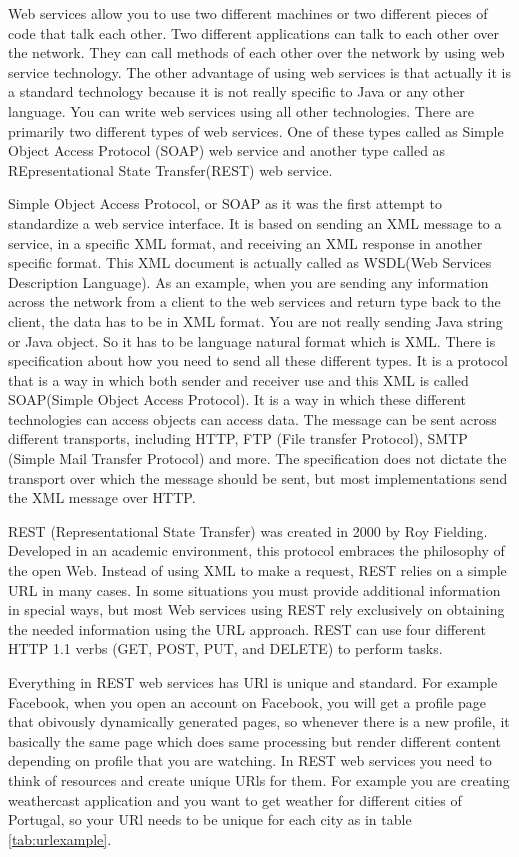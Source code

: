 \documentclass[runningheads,a4paper]{llncs}
\begin{document}
Web services allow you to use two different machines or two different pieces of code that talk each other. Two different applications can talk to each other over the network. They can call methods of each other over the network by using web service technology. The other advantage of using web services is that actually it is a standard technology because it is not really specific to Java or any other language. You can write web services using all other technologies. There are primarily two different types of web services. One of these types called as Simple Object Access Protocol (SOAP) web service and another type called as REpresentational State Transfer(REST) web service.

Simple Object Access Protocol, or SOAP as it was the first attempt to standardize a web service interface. It is based on sending an XML message to a service, in a specific XML format, and receiving an XML response in another specific format. This XML document is actually called as WSDL(Web Services Description Language)\cite{state3}. As an example, when you are sending any information across the network from a client to the web services and return type back to the client, the data has to be in XML format. You are not really sending Java string or Java object. So it has to be language natural format which is XML. There is specification about how you need to send all these different types. It is a protocol that is a way in which both sender and receiver use and this XML is called SOAP(Simple Object Access Protocol). It is a way in which these different technologies can access objects can access data. The message can be sent across different transports, including HTTP, FTP (File transfer Protocol), SMTP (Simple Mail Transfer Protocol) and more\cite{state2}. The specification does not dictate the transport over which the message should be sent, but most implementations send the XML message over HTTP.

REST (Representational State Transfer) was created in 2000 by Roy Fielding\cite{state5_1}. Developed in an academic environment, this protocol embraces the philosophy of the open Web. Instead of using XML to make a request, REST relies on a simple URL in many cases. In some situations you must provide additional information in special ways, but most Web services using REST rely exclusively on obtaining the needed information using the URL approach. REST can use four different HTTP 1.1 verbs (GET, POST, PUT, and DELETE) to perform tasks.

Everything in REST web services has URl is unique and standard. For example Facebook, when you open an account on Facebook, you will get a profile page that obivously dynamically generated pages, so whenever there is a new profile, it basically the same page which does same processing but render different content depending on profile that you are watching. In REST web services you need to think of resources and create unique URls for them. For example you are creating weathercast application and you want to get weather for different cities of Portugal, so your URl needs to be unique for each city as in table \ref{tab:urlexample}.
\end{document}
